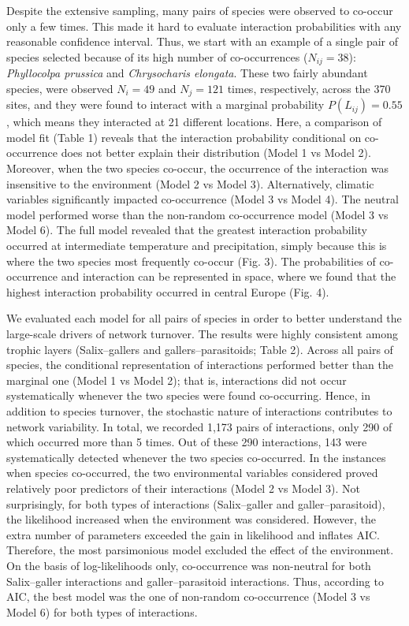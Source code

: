 \documentclass[12pt]{article}
\begin{document}
Despite the extensive sampling, many pairs of species were observed to co-occur
only a few times. This made it hard to evaluate interaction probabilities with
any reasonable confidence interval. Thus, we start with an example of a single
pair of species selected because of its high number of co-occurrences
($N_{ij}=38$): \textit{Phyllocolpa prussica} and \textit{Chrysocharis
elongata}. These two fairly abundant species, were observed $N_i=49$ and $N_j=121$
times, respectively, across the 370 sites, and they were found to
interact with a marginal probability $P(L_{ij})=0.55$, which means they
interacted at 21 different locations. Here, a comparison of model fit (Table
1) reveals that the interaction probability conditional on co-occurrence
does not better explain their distribution (Model 1 vs Model 2). Moreover, when the two
species co-occur, the occurrence of the interaction was insensitive to the
environment (Model 2 vs Model 3). Alternatively, climatic variables
significantly impacted co-occurrence (Model 3 vs Model 4). The neutral model
performed worse than the non-random co-occurrence model (Model 3 vs Model 6).
The full model revealed that the greatest interaction probability occurred at
intermediate temperature and precipitation, simply because this is where the
two species most frequently co-occur (Fig. 3). The probabilities of co-occurrence
and interaction can be represented in space, where we found that the
highest interaction probability occurred in central Europe (Fig. 4).

We evaluated each model for all pairs of species in order to better understand
the large-scale drivers of network turnover. The results were highly consistent
among trophic layers (Salix–gallers and gallers–parasitoids; Table 2). Across
all pairs of species, the conditional representation of interactions performed 
better than the marginal one (Model 1 vs Model 2); that is, interactions did
not occur systematically whenever the two species were found co-occurring.
Hence, in addition to species turnover, the stochastic nature of interactions
contributes to network variability. In total, we recorded 1,173 pairs of
interactions, only 290 of which occurred more than 5 times. Out of these 290
interactions, 143 were systematically detected whenever the two species co-occurred.
In the instances when species co-occurred, the two environmental
variables considered proved relatively poor predictors of their interactions
(Model 2 vs Model 3). Not surprisingly, for both types of interactions
(Salix–galler and galler–parasitoid), the likelihood increased when the
environment was considered. However, the extra number of parameters exceeded the
gain in likelihood and inflates AIC. Therefore, the most parsimonious model
excluded the effect of the environment. On the basis of log-likelihoods only,
co-occurrence was non-neutral for both Salix–galler interactions and
galler–parasitoid interactions. Thus, according to AIC, the best model was the
one of non-random co-occurrence (Model 3 vs Model 6) for both types of
interactions.
\end{document}
